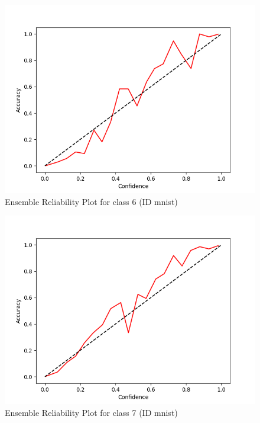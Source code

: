 \documentclass[11pt]{article}
\begin{document}
\begin{figure}[htbp]
\centering
\includegraphics[width=.9\linewidth]{./ens_mnist_rel_6.png}
\caption{\label{fig:orgcacddd3}
Ensemble Reliability Plot for class 6 (ID mnist)}
\end{figure}

\begin{figure}[htbp]
\centering
\includegraphics[width=.9\linewidth]{./ens_mnist_rel_7.png}
\caption{\label{fig:org9fdb3b5}
Ensemble Reliability Plot for class 7 (ID mnist)}
\end{figure}
\end{document}
